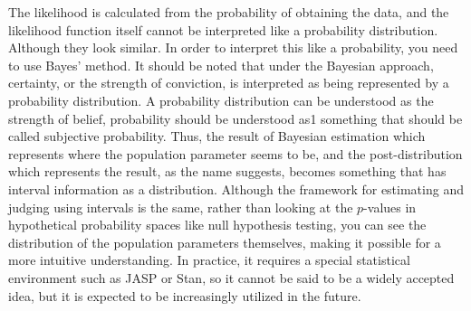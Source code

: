 \documentclass{ltjbook}
\begin{document}
The likelihood is calculated from the probability of obtaining the data, and the likelihood function itself cannot be interpreted like a probability distribution. Although they look similar.
In order to interpret this like a probability, you need to use Bayes' method. It should be noted that under the Bayesian approach, certainty, or the strength of conviction, is interpreted as being represented by a probability distribution. A probability distribution can be understood as the strength of belief, probability should be understood as1 something that should be called subjective probability. Thus, the result of Bayesian estimation which represents where the population parameter seems to be, and the post-distribution which represents the result, as the name suggests, becomes something that has interval information as a distribution. Although the framework for estimating and judging using intervals is the same, rather than looking at the $p$-values in hypothetical probability spaces like null hypothesis testing, you can see the distribution of the population parameters themselves, making it possible for a more intuitive understanding. In practice, it requires a special statistical environment such as JASP or Stan, so it cannot be said to be a widely accepted idea, but it is expected to be increasingly utilized in the future.
\end{document}
